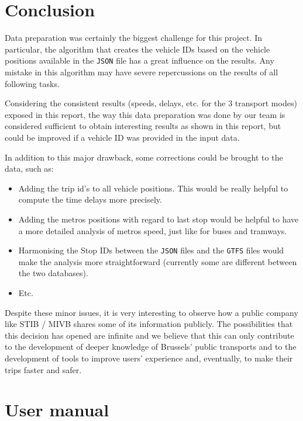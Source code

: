 \documentclass{article}
\begin{document}
\section{Conclusion}

Data preparation was certainly the biggest challenge for this project. In particular, the algorithm that creates the vehicle IDs based on the vehicle positions available in the \texttt{JSON} file has a great influence on the results. Any mistake in this algorithm may have severe repercussions on the results of all following tasks.

Considering the consistent results (speeds, delays, etc. for the 3 transport modes) exposed in this report, the way this data preparation was done by our team is considered sufficient to obtain interesting results as shown in this report, but could be improved if a vehicle ID was provided in the input data.

In addition to this major drawback, some corrections could be brought to the data, such as:
\begin{itemize}
    \item Adding the trip id's to all vehicle positions. This would be really helpful to compute the time delays more precisely.
    \item Adding the metros positions with regard to last stop would be helpful to have a more detailed analysis of metros speed, just like for buses and tramways.
    \item Harmonising the Stop IDs between the \texttt{JSON} files and the \texttt{GTFS} files would make the analysis more straightforward (currently some are different between the two databases).
    \item Etc.
\end{itemize}

Despite these minor issues, it is very interesting to observe how a public company like STIB / MIVB shares some of its information publicly. The possibilities that this decision has opened are infinite and we believe that this can only contribute to the development of deeper knowledge of Brussels' public transports and to the development of tools to improve users' experience and, eventually, to make their trips faster and safer.

\newpage

\appendix

\section{User manual}
\end{document}

